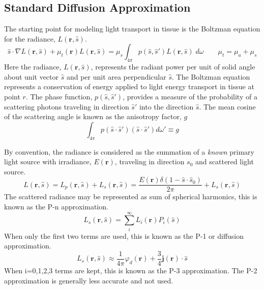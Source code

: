 \documentclass{article}         %
\theoremstyle{definition}
\theoremstyle{remark}
\begin{document}
\subsection{Standard Diffusion Approximation}
The starting point for modeling light transport in tissue is the Boltzman
equation for the radiance, $L(\mathbf{r},\hat{s})$.
\begin{equation}\label{TransportEquation}
\hat{s} \cdot \nabla L(\mathbf{r},\hat{s})
+ \mu_t (\mathbf{r})  L(\mathbf{r},\hat{s})
 = 
\mu_s \int_{4\pi} p(\hat{s},\hat{s}') L(\mathbf{r},\hat{s}) \; d \omega
\qquad
\mu_t = \mu_a + \mu_s
\end{equation}
Here the radiance,  $L(\mathbf{r},\hat{s}) $, represents the radiant power per unit
of solid angle about unit vector $\hat{s}$ and per unit area perpendicular
$\hat{s}$.
The Boltzman equation represents a conservation of energy applied to light
energy transport in tissue at point $r$.
The phase function, $p(\hat{s},\hat{s}')$, provides a measure of the
probability of a scattering photons traveling in direction $\hat{s}'$ 
into the direction $\hat{s}$. The mean cosine  of the scattering angle
is known as the anisotropy factor, $g$
\[
 \int_{4\pi} p(\hat{s} \cdot \hat{s}')(\hat{s} \cdot \hat{s}') d\omega' \equiv g
\]

By convention, the radiance is considered as the summation of a
\textit{known} primary light source with irradiance, $E(\mathbf{r})$, traveling in
direction $s_0$ and scattered light source.
\[
  L(\mathbf{r},\hat{s}) = L_p(\mathbf{r},\hat{s}) + L_s(\mathbf{r},\hat{s})
               = \frac{E(\mathbf{r})  \delta( 1 - \hat{s} \cdot \hat{s}_0)}{
2\pi}  + L_s(\mathbf{r},\hat{s})
\]
The scattered radiance may be represented as sum of spherical harmonics,
this is known as the P-n approximation\cite{Welch95,Modest2003}. 
\[
  L_s(\mathbf{r},\hat{s})  = \sum^\infty_i L_i(\mathbf{r}) P_i(\hat{s})
\]
When only the first two terms are used, this is known as the
P-1\cite{Modest2003} or diffusion approximation\cite{Modest2003}. 
\begin{equation} \label{DiffusionApproximation}
  L_s(\mathbf{r},\hat{s})  \approx \frac{1}{4 \pi} \varphi_d(\mathbf{r}) + \frac{3}{4} \mathbf{j}(\mathbf{r}) \cdot \hat{s}
\end{equation}
When i=0,1,2,3 terms are kept, this is known as the P-3
approximation. The P-2 approximation is generally less accurate and not
used\cite{Modest2003}.
\end{document}
